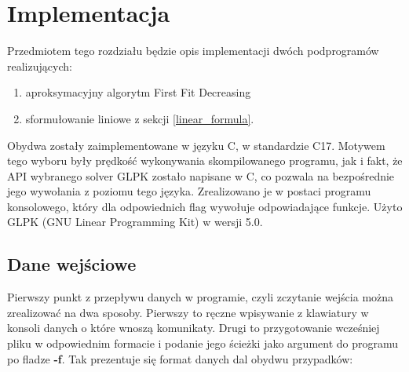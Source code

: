 \chapter{Implementacja}
\thispagestyle{chapterBeginStyle}

Przedmiotem tego rozdziału będzie opis implementacji dwóch podprogramów realizujących: 
\begin{enumerate}
	\item aproksymacyjny algorytm First Fit Decreasing 
	\item sformułowanie liniowe z sekcji \ref{linear_formula}.	
\end{enumerate}

Obydwa zostały zaimplementowane w języku C, w standardzie C17. Motywem tego wyboru były prędkość wykonywania skompilowanego programu, jak i fakt, że API wybranego solver GLPK zostało napisane w C, co pozwala na bezpośrednie jego wywołania z poziomu tego języka\cite{GLPK_API}.
Zrealizowano je w postaci programu konsolowego, który dla odpowiednich flag wywołuje odpowiadające funkcje. Użyto GLPK (GNU Linear Programming Kit) w wersji 5.0.

\section{Dane wejściowe}
Pierwszy punkt z przepływu danych w programie, czyli zczytanie wejścia można zrealizować na dwa sposoby. Pierwszy to ręczne wpisywanie z klawiatury w konsoli danych o które wnoszą komunikaty. Drugi to przygotowanie wcześniej pliku w odpowiednim formacie i podanie jego ścieżki jako argument do programu po fladze \textbf{-f}. Tak prezentuje się format danych dal obydwu przypadków: \\


